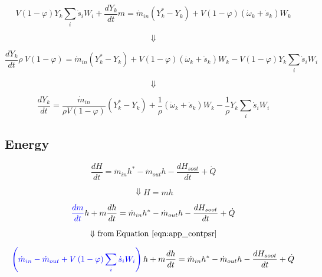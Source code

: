 \begin{equation*}
	V\left(1-\varphi\right)Y_k\sum_{i}{{\dot{s}}_iW_i}
	+
	\frac{dY_k}{dt}m=
	{\dot{m}}_{in}
	\left(
		Y_k^\ast - Y_k
	\right)
	+
	V\left(1-\varphi\right)\left({\dot{\omega}}_k+{\dot{s}}_k\right)W_k
\end{equation*}

\begin{equation*}
	\Downarrow
\end{equation*}

\begin{equation*}
	\frac{dY_k}{dt}\rho\ V\left(1-\varphi\right)={\dot{m}}_{in}\left(Y_k^\ast-Y_k\right)+V\left(1-\varphi\right)\left({\dot{\omega}}_k+{\dot{s}}_k\right)W_k-V\left(1-\varphi\right)Y_k\sum_{i}{{\dot{s}}_iW_i}
\end{equation*}

\begin{equation*}
	\Downarrow
\end{equation*}

\begin{equation}
	\frac{dY_k}{dt}=\frac{{\dot{m}}_{in}}{\rho V\left(1-\varphi\right)}\left(Y_k^\ast-Y_k\right)+\frac{1}{\rho}\left({\dot{\omega}}_k+{\dot{s}}_k\right)W_k-\frac{1}{\rho}Y_k\sum_{i}{{\dot{s}}_iW_i}
	\label{eqn:app_spiciespsr}
\end{equation}

\subsection{Energy}

\begin{equation*}
	\frac{dH}{dt}={\dot{m}}_{in}h^\ast-{\dot{m}}_{out}h-\frac{dH_{soot}}{dt}+\dot{Q}
\end{equation*}

\begin{equation*}
	\Downarrow H=mh
\end{equation*}


\begin{equation*}
	\color{blue}
	\frac{dm}{dt}
	\color{black}
	h+m\frac{dh}{dt}={\dot{m}}_{in}h^\ast-{\dot{m}}_{out}h-\frac{dH_{soot}}{dt}+\dot{Q}
\end{equation*}

\begin{equation*}
	\Downarrow \mathrm{from \: Equation~\ref{eqn:app_contpsr}}
\end{equation*}

\begin{equation*}
	\color{blue}
	\left(
		{\dot{m}}_{in}-{\dot{m}}_{out}
		+V\left(1-\varphi\right)\sum_{i}{{\dot{s}}_iW_i}
	\right)
	\color{black}h+m\frac{dh}{dt}={\dot{m}}_{in}h^\ast-{\dot{m}}_{out}h-\frac{dH_{soot}}{dt}+\dot{Q}
\end{equation*}

